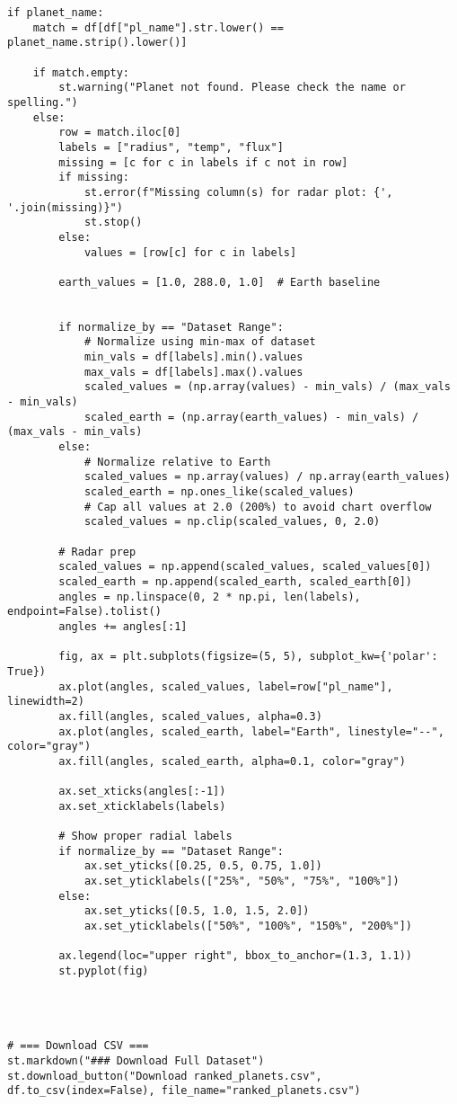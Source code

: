 \documentclass[12pt]{article}
\begin{document}
\begin{verbatim}
if planet_name:
    match = df[df["pl_name"].str.lower() == planet_name.strip().lower()]
    
    if match.empty:
        st.warning("Planet not found. Please check the name or spelling.")
    else:
        row = match.iloc[0]
        labels = ["radius", "temp", "flux"]
        missing = [c for c in labels if c not in row]
        if missing:
            st.error(f"Missing column(s) for radar plot: {', '.join(missing)}")
            st.stop()
        else:
            values = [row[c] for c in labels]

        earth_values = [1.0, 288.0, 1.0]  # Earth baseline


        if normalize_by == "Dataset Range":
            # Normalize using min-max of dataset
            min_vals = df[labels].min().values
            max_vals = df[labels].max().values
            scaled_values = (np.array(values) - min_vals) / (max_vals - min_vals)
            scaled_earth = (np.array(earth_values) - min_vals) / (max_vals - min_vals)
        else:
            # Normalize relative to Earth
            scaled_values = np.array(values) / np.array(earth_values)
            scaled_earth = np.ones_like(scaled_values)
            # Cap all values at 2.0 (200%) to avoid chart overflow
            scaled_values = np.clip(scaled_values, 0, 2.0)

        # Radar prep
        scaled_values = np.append(scaled_values, scaled_values[0])
        scaled_earth = np.append(scaled_earth, scaled_earth[0])
        angles = np.linspace(0, 2 * np.pi, len(labels), endpoint=False).tolist()
        angles += angles[:1]

        fig, ax = plt.subplots(figsize=(5, 5), subplot_kw={'polar': True})
        ax.plot(angles, scaled_values, label=row["pl_name"], linewidth=2)
        ax.fill(angles, scaled_values, alpha=0.3)
        ax.plot(angles, scaled_earth, label="Earth", linestyle="--", color="gray")
        ax.fill(angles, scaled_earth, alpha=0.1, color="gray")

        ax.set_xticks(angles[:-1])
        ax.set_xticklabels(labels)

        # Show proper radial labels
        if normalize_by == "Dataset Range":
            ax.set_yticks([0.25, 0.5, 0.75, 1.0])
            ax.set_yticklabels(["25%", "50%", "75%", "100%"])
        else:
            ax.set_yticks([0.5, 1.0, 1.5, 2.0])
            ax.set_yticklabels(["50%", "100%", "150%", "200%"])

        ax.legend(loc="upper right", bbox_to_anchor=(1.3, 1.1))
        st.pyplot(fig)




# === Download CSV ===
st.markdown("### Download Full Dataset")
st.download_button("Download ranked_planets.csv", df.to_csv(index=False), file_name="ranked_planets.csv")
\end{verbatim}
\end{document}
